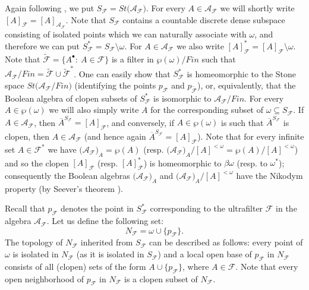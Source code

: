 \documentclass[a4paper,11pt,fleqn]{amsart}
\theoremstyle{definition}
\theoremstyle{remark}
\numberwithin{equation}{section}
\newcommand{\N}{\mathbb{N}}
\newcommand{\aA}{\mathcal{A}}
\newcommand{\fF}{\mathcal{F}}
\newcommand{\ol}{\overline}
\newcommand{\sm}{\setminus}
\newcommand{\sub}{\subseteq}
\newcommand{\clopen}[1]{\left[#1\right]}
\newcommand{\wo}{{\wp(\omega)}}%
\newcommand{\bo}{{\beta\omega}}%
\begin{document}
Again following \cite[Section 3]{MS24}, we put $S_{\fF}=St\big(\aA_\fF\big)$. For every $A\in\aA_{\fF}$ we will shortly write $\clopen{A}_{\fF}=\clopen{A}_{\aA_{\fF}}$. Note that $S_{\fF}$ contains a countable discrete dense subspace consisting of isolated points which we can naturally associate with $\omega$, and therefore we can put $S_{\fF}^*=S_{\fF}\sm\omega$. For $A\in\aA_{\fF}$ we also write $\clopen{A}_{\fF}^*=\clopen{A}_{\fF}\sm\omega$. Note that $\tilde{\fF}=\big\{A^\bullet\colon\ A\in\fF\big\}$ is a filter in $\wo/Fin$ such that $\aA_{\fF}/Fin=\tilde{\fF}\cup\tilde{\fF}^*$. One can easily show that $S_{\fF}^*$ is homeomorphic to the Stone space $St\big(\aA_{\fF}/Fin\big)$ (identifying the points $p_\fF$ and $p_{\tilde{\fF}}$), or, equivalently, that the Boolean algebra of clopen subsets of $S_{\fF}^*$ is isomorphic to $\aA_{\fF}/Fin$. For every $A\in\wo$ we will also simply write $A$ for the corresponding subset of $\omega\sub S_{\fF}$. If $A\in\aA_{\fF}$, then $\ol{A}^{S_{\fF}}=\clopen{A}_{\fF}$, and conversely, if $A\in\wo$ is such that $\ol{A}^{S_{\fF}}$ is clopen, then $A\in\aA_{\fF}$ (and hence again $\ol{A}^{S_{\fF}}=\clopen{A}_{\fF}$). 
Note that for every infinite set $A\in\fF^*$ we have $\big(\aA_\fF\big)_{A}=\wp(A)$ (resp. $\big(\aA_\fF\big)_A/[A]^{<\omega}=\wp(A)/[A]^{<\omega}$) and so the clopen $\clopen{A}_{\fF}$ (resp. $\clopen{A}_{\fF}^*$) is homeomorphic to $\bo$ (resp. to $\omega^*$); consequently the Boolean algebras $\big(\aA_\fF\big)_{A}$ and $\big(\aA_\fF\big)_{A}/[A]^{<\omega}$ have the Nikodym property (by Seever's theorem \cite{See68}). 


Recall that $p_\fF$ denotes the point in $S_\fF^*$ corresponding to the ultrafilter $\fF$ in the algebra $\aA_\fF$. Let us define the following set:
\[N_{\fF}=\omega\cup\big\{p_{\fF}\big\}.\]
The topology of $N_{\fF}$ inherited from $S_{\fF}$ can be described as follows: every point of $\omega$ is isolated in $N_{\fF}$ (as it is isolated in $S_{\fF}$) and a local open base of $p_\fF$ in $N_\fF$ consists of all (clopen) sets of the form $A\cup\big\{p_{\fF}\big\}$, where $A\in\fF$. Note that every open neighborhood of $p_{\fF}$ in $N_{\fF}$ is a clopen subset of $N_{\fF}$.
\end{document}
